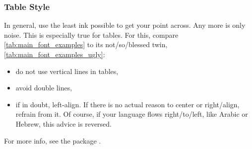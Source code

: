 \subsubsection{Table Style}

In general, use the least ink possible to get your point across.
Any more is only noise.
This is especially true for tables.
For this, compare \cref{tab:main_font_examples} to its not\-/so\-/blessed
twin, \cref{tab:main_font_examples_ugly}:
\begin{itemize}
    \item do not use vertical lines in tables,
    \item avoid double lines,
    \item if in doubt, left-align.
          If there is no actual reason to center or right\-/align, refrain from it.
          Of course, if your language flows right\-/to\-/left, like Arabic or Hebrew,
          this advice is reversed.
\end{itemize}
For more info, see the package .

\begin{table}
\end{table}

